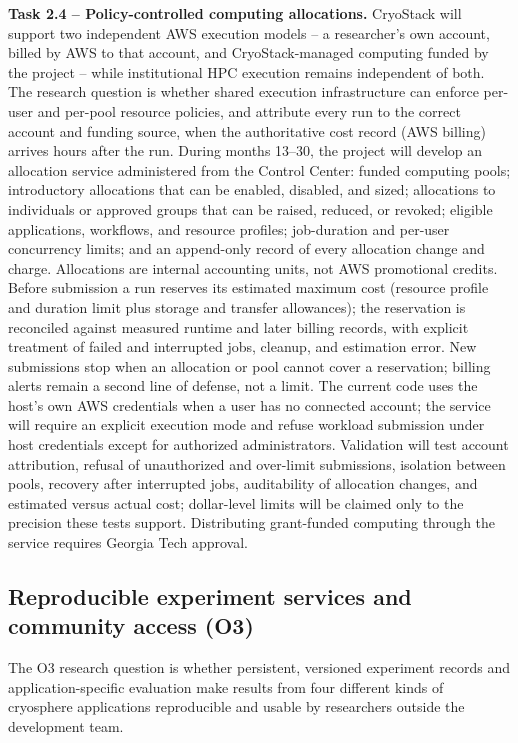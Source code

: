 \textbf{Task 2.4 -- Policy-controlled computing allocations.} CryoStack will
support two independent AWS execution models -- a researcher's own account,
billed by AWS to that account, and CryoStack-managed computing funded by the
project -- while institutional HPC execution remains independent of both. The
research question is whether shared execution infrastructure can enforce
per-user and per-pool resource policies, and attribute every run to the
correct account and funding source, when the authoritative cost record (AWS
billing) arrives hours after the run. During months 13--30, the project will
develop an allocation service administered from the Control Center: funded
computing pools; introductory allocations that can be enabled, disabled, and
sized; allocations to individuals or approved groups that can be raised,
reduced, or revoked; eligible applications, workflows, and resource profiles;
job-duration and per-user concurrency limits; and an append-only record of
every allocation change and charge. Allocations are internal accounting units,
not AWS promotional credits. Before submission a run reserves its estimated
maximum cost (resource profile and duration limit plus storage and transfer
allowances); the reservation is reconciled against measured runtime and later
billing records, with explicit treatment of failed and interrupted jobs,
cleanup, and estimation error. New submissions stop when an allocation or pool
cannot cover a reservation; billing alerts remain a second line of defense,
not a limit. The current code uses the host's own AWS credentials when a user
has no connected account; the service will require an explicit execution mode
and refuse workload submission under host credentials except for authorized
administrators. Validation will test account attribution, refusal of
unauthorized and over-limit submissions, isolation between pools, recovery
after interrupted jobs, auditability of allocation changes, and estimated
versus actual cost; dollar-level limits will be claimed only to the precision
these tests support. Distributing grant-funded computing through the service
requires Georgia Tech approval.

\subsection{Reproducible experiment services and community access (\textbf{O3})}

The O3 research question is whether persistent, versioned experiment records
and application-specific evaluation make results from four different kinds of
cryosphere applications reproducible and usable by researchers outside the
development team.

